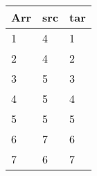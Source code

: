 \begin{minipage}{0.48\textwidth}

    \begin{tabular}{|l|l|l|}
      \hline
      Arr & src & tar \\ \hline
      1   & 4   & 1   \\ \hline
      2   & 4   & 2   \\ \hline
      3   & 5   & 3   \\ \hline
      4   & 5   & 4   \\ \hline
      5   & 5   & 5   \\ \hline
      6   & 7   & 6   \\ \hline
      7   & 6   & 7   \\ \hline
    \end{tabular}
  \end{minipage}

